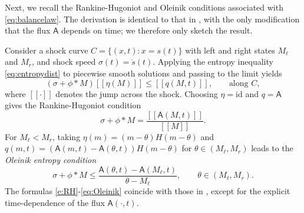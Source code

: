 \documentclass[10pt,a4paper]{amsart}
\def\A{\mathsf{A}}
\begin{document}
	Next, we recall the Rankine-Hugoniot and Oleinik conditions associated with \eqref{eq:balancelaw}. The derivation is identical to that in \cite{leslie2023sticky}, with the only modification that the flux $\A$ depends on time; we therefore only sketch the result.
	
	Consider a shock curve $C = \{(x,t): x = s(t)\}$ with left and right states $M_\ell$ and $M_r$, and shock speed $\sigma(t) = \dot{s}(t)$. Applying the entropy inequality \eqref{eq:entropydist} to piecewise smooth solutions and passing to the limit yields
	\[
	(\sigma + \phi\ast M)[[\eta(M)]] \le [[q(M,t)]],\qquad \text{along }C,
	\]
	where $[[\cdot]]$ denotes the jump across the shock. Choosing $\eta = \mathrm{id}$ and $q = \A$ gives the Rankine-Hugoniot condition
	\begin{equation}
		\label{e:RH}
		\sigma +\phi\ast M = \frac{[[\A(M,t)]]}{[[M]]}.
	\end{equation}
	For $M_\ell<M_r$, taking $\eta(m) = (m-\theta) H(m-\theta)$ and 
	$q(m,t)=(\A(m,t)-\A(\theta,t))H(m-\theta)$ for $\theta\in(M_\ell, M_r)$ leads to the \emph{Oleinik entropy condition}
	\begin{equation}
		\label{eq:Oleinik}
		\sigma + \phi\ast M\le \frac{\A(\theta,t) - \A(M_\ell,t)}{\theta - M_\ell},
		\qquad \theta\in (M_\ell, M_r).
	\end{equation}
	The formulas \eqref{e:RH}-\eqref{eq:Oleinik} coincide with those in \cite{leslie2023sticky}, except for the explicit time-dependence of the flux $\A(\cdot,t)$.
	
\end{document}
